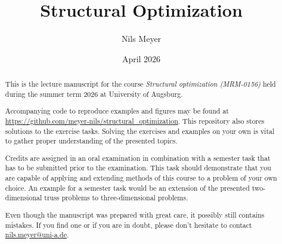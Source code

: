 \documentclass[a4paper]{report}
\title{Structural Optimization}
\author{Nils Meyer}
\date{April 2026}
\begin{document}
\maketitle

\begin{abstract}
    This is the lecture manuscript for the course \emph{Structural optimization (MRM-0156)} held during the summer term 2026 at University of Augsburg. 

    Accompanying code to reproduce examples and figures may be found at \url{https://github.com/meyer-nils/structural_optimization}. This repository also stores solutions to the exercise tasks. Solving the exercises and examples on your own is vital to gather proper understanding of the presented topics. 

    Credits are assigned in an oral examination in combination with a semester task that has to be submitted prior to the examination. This task should demonstrate that you are capable of applying and extending methods of this course to a problem of your own choice. An example for a semester task would be an extension of the presented two-dimensional truss problems to three-dimensional problems. 

    Even though the manuscript was prepared with great care, it possibly still contains mistakes. If you find one or if you are in doubt, please don't hesitate to contact \href{mailto:nils.meyer@uni-a.de}{nils.meyer@uni-a.de}. 
\end{abstract}

\setcounter{tocdepth}{1}
\tableofcontents









\end{document}
